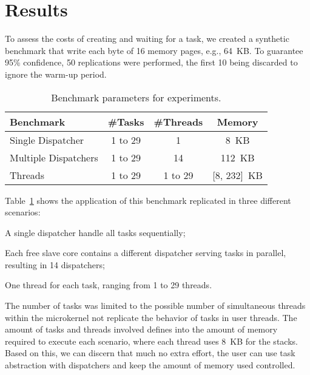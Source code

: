 \section{Results}
\label{sec:results}

	To assess the costs of creating and waiting for a task, we created
	a synthetic benchmark that write each byte of 16 memory pages, e.g., 64~KB.
	To guarantee 95\% confidence, 50 replications were performed, the first 10
	being discarded to ignore the warm-up period.

	\begin{table}[t]
	\centering
	\caption{Benchmark parameters for experiments.}
	\label{tab:parameters}
	\begin{tabular}{lccc}
	\toprule
			\textbf{Benchmark}   & \textbf{\#Tasks} & \textbf{\#Threads} & \textbf{Memory} \\
			\midrule
			Single Dispatcher    & 1 to 29          & 1                  & 8~KB            \\
			Multiple Dispatchers & 1 to 29          & 14                 & 112~KB          \\
			Threads              & 1 to 29          & 1 to 29            & [8, 232]~KB     \\
			\bottomrule
	\end{tabular}
	\end{table}

	Table~\ref{tab:parameters} shows the application of this benchmark replicated in three
	different scenarios:
	\begin{enumerate*}[label=(\roman*)]
		\item A single dispatcher handle all tasks sequentially;
		\item Each free slave core contains a different dispatcher serving
			tasks in parallel, resulting in 14 dispatchers;
		\item One thread for each task, ranging from 1 to 29 threads.
	\end{enumerate*}
	The number of tasks was limited to the possible number of simultaneous
	threads within the microkernel not replicate the behavior of tasks in user
	threads. The amount of tasks and threads involved defines into the amount
	of memory required to execute each scenario, where each thread uses 8~KB
	for the stacks. Based on this, we can discern that much no extra effort,
	the user can use task abstraction with dispatchers and keep the amount of
	memory used controlled.


